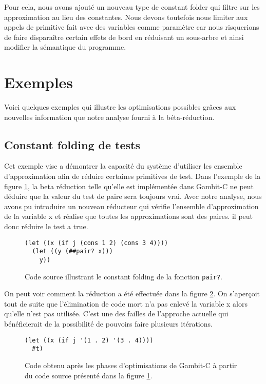 Pour cela, nous avons ajouté un nouveau type de constant folder qui
filtre sur les approximation au lieu des constantes.  Nous devons
toutefois nous limiter aux appels de primitive fait avec des variables
comme paramètre car nous risquerions de faire disparaître certain
effets de bord en réduisant un sous-arbre et ainsi modifier la
sémantique du programme.

\clearpage

\section{Exemples}

Voici quelques exemples qui illustre les optimisations possibles grâces aux
nouvelles information que notre analyse fourni à la béta-réduction.

\subsection{\og Constant folding \fg de tests}

Cet exemple vise a démontrer la capacité du système d'utiliser les
ensemble d'approximation afin de réduire certaines primitives de
test. Dans l'exemple de la figure \ref{cfa-ex1-source}, la beta
réduction telle qu'elle est implémentée dans Gambit-C ne peut déduire
que la valeur du test de paire sera toujours vrai.  Avec notre
analyse, nous avons pu introduire un nouveau réducteur qui vérifie
l'ensemble d'approximation de la variable x et réalise que toutes les
approximations sont des paires. il peut donc réduire le test a true.

  \begin{figure}[htbp!]
    \begin{lstlisting}
(let ((x (if j (cons 1 2) (cons 3 4))))
  (let ((y (##pair? x)))
    y))
    \end{lstlisting}
    \caption{Code source illustrant le \og constant folding \fg de la
      fonction \texttt{pair?}.}
    \label{cfa-ex1-source}
  \end{figure}

On peut voir comment la réduction a été effectuée dans la figure
\ref{cfa-ex1-out}. On s'aperçoit tout de suite que l'élimination de
code mort n'a pas enlevé la variable x alors qu'elle n'est pas
utilisée. C'est une des failles de l'approche actuelle qui
bénéficierait de la possibilité de pouvoirs faire plusieurs
itérations.

 \begin{figure}[htbp!]
    \begin{lstlisting}
(let ((x (if j '(1 . 2) '(3 . 4))))
  #t)
    \end{lstlisting}
    \caption{Code obtenu après les phases d'optimisations de Gambit-C à
      partir du code source présenté dans la figure \ref{cfa-ex1-source}.}
    \label{cfa-ex1-out}
  \end{figure}

